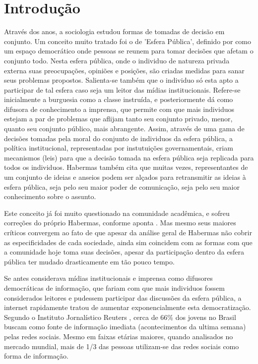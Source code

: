 \documentclass[
	12pt,				%
	oneside,			%
	a4paper,			%
	english,			%
	brazil				%
	]{abntex2ppgsi}
\begin{document}
\chapter{Introdução}
\label{sec:intro}

Através dos anos, a sociologia estudou formas de tomadas de decisão em conjunto. Um conceito muito tratado foi o de 'Esfera Pública', definido por  como um espaço democrático onde pessoas se reunem para tomar decisões que afetam o conjunto todo. Nesta esfera pública, onde o individuo de natureza privada externa suas preocupações, opiniões e posições, são criadas medidas para sanar seus problemas propostos. Salienta-se também que o individuo só esta apto a participar de tal esfera caso seja um leitor das mídias institucionais. Refere-se inicialmente a burguesia como a classe instruída, e posteriormente dá como difusora de conhecimento a imprensa, que permite com que mais individuos estejam a par de problemas que aflijam tanto seu conjunto privado, menor, quanto seu conjunto público, mais abrangente. Assim, através de uma gama de decisões tomadas pela moral do conjunto de individuos da esfera pública, a política institucional, representadas por instutuições governamentais, criam mecanismos (leis) para que a decisão tomada na esfera pública seja replicada para todos os individuos. Habermas também cita que muitas vezes, representantes de um conjunto de ideias e anseios podem ser alçados para retransmitir as ideias à esfera pública, seja pelo seu maior poder de comunicação, seja pelo seu maior conhecimento sobre o assunto. 

Este conceito já foi muito questionado na comunidade acadêmica, e sofreu correções do próprio Habermas, conforme aponta . Mas mesmo seus maiores críticos convergem ao fato de que apesar da análise geral de Habermas não cobrir as especificidades de cada sociedade, ainda sim coincidem com as formas com que a comunidade hoje toma suas decisões, apesar da participação dentro da esfera pública ter mudado drasticamente em tão pouco tempo.

Se antes  considerava mídias institucionais e imprensa como difusores democráticas de informação, que fariam com que mais individuos fossem considerados leitores e pudessem participar das discussões da esfera pública, a internet rapidamente tratou de aumentar exponencialmente esta democratização. Segundo o Instituto Jornalístico Reuters \cite{reuters}, cerca de 66\% dos jovens no Brasil buscam como fonte de informação imediata (acontecimentos da ultima semana) pelas redes sociais. Mesmo em faixas etárias maiores, quando analisados no mercado mundial, mais de 1/3 das pessoas utilizam-se das redes sociais como forma de informação.
\end{document}
